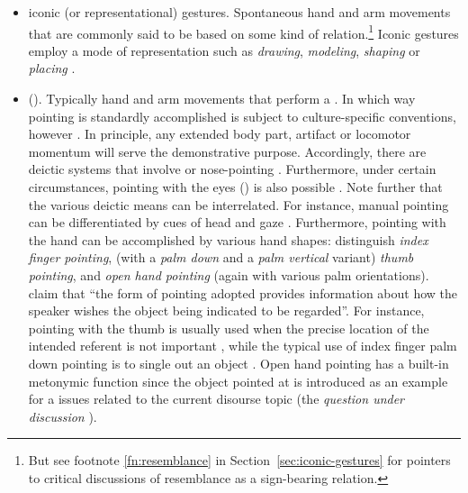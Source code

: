 \documentclass[output=paper]{langsci/langscibook}
\begin{document}
\begin{itemize}
\item iconic (or representational)   gestures. Spontaneous hand and arm movements that are commonly said to be based on some kind of   relation.\footnote{But see footnote \ref{fn:resemblance} in Section~\ref{sec:iconic-gestures} for pointers to critical discussions of resemblance as a sign-bearing relation.} Iconic gestures employ a mode of representation such as \textit{drawing}, \textit{modeling}, \textit{shaping} or \textit{placing} \citep{Streeck:2008,Mueller:1998}.
\item {} (). Typically hand and arm movements that perform a . 
%
In which way pointing is standardly accomplished is subject to culture-specific conventions, however \citep{Wilkins:2003}. 
%
In principle, any extended body part, artifact or locomotor momentum will serve the demonstrative purpose. 
%
Accordingly, there are deictic systems that involve  \citep{Enfield:2001} or nose-pointing \citep{Cooperrider:Nunez:2012}. 
%
Furthermore, under certain circumstances, pointing with the eyes () is also possible \citep{Hadjikhani:Hoge:Snyder:de:Gelder:2008}. 
%
Note further that the various deictic means can be interrelated. For instance, manual pointing can be differentiated by cues of head and gaze \citep{Butterworth:Itakura:2000}.
%
Furthermore, pointing with the hand can be accomplished by various hand shapes: \citet{Kendon:Versante:2003} distinguish \emph{index finger pointing},  (with a \emph{palm down}  and a \emph{palm vertical}  variant) \emph{thumb pointing},  and \emph{open hand pointing}  (again with various palm orientations).
%
\citet[]{Kendon:Versante:2003} claim that \enquote{the form of pointing adopted provides information about how the speaker wishes the object being indicated to be regarded}.
%
For instance, pointing with the thumb is usually used when the precise location of the intended referent is not important \citep[--125]{Kendon:Versante:2003}, while the typical use of index finger palm down pointing is to single out an object \citep[]{Kendon:Versante:2003}. 
%
Open hand pointing has a built-in metonymic function since the object pointed at is introduced as an example for a issues related to the current disourse topic (the \emph{question under discussion}  \citep{Ginzburg:2012}).

\end{itemize}
\end{document}

